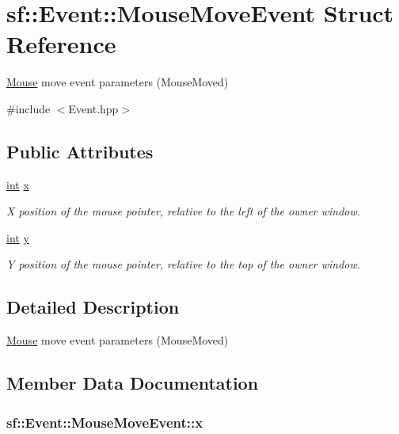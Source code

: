 \hypertarget{structsf_1_1_event_1_1_mouse_move_event}{\section{sf\-:\-:Event\-:\-:Mouse\-Move\-Event Struct Reference}
\label{structsf_1_1_event_1_1_mouse_move_event}
}


\hyperlink{classsf_1_1_mouse}{Mouse} move event parameters (Mouse\-Moved)  




{\ttfamily \#include $<$Event.\-hpp$>$}

\subsection*{Public Attributes}
\begin{DoxyCompactItemize}
\item 
\hyperlink{term__entry_8h_ad65b480f8c8270356b45a9890f6499ae}{int} \hyperlink{structsf_1_1_event_1_1_mouse_move_event_aa3a23809afb905cbb52c66d8512e21fd}{x}
\begin{DoxyCompactList}\small\item\em X position of the mouse pointer, relative to the left of the owner window. \end{DoxyCompactList}\item 
\hyperlink{term__entry_8h_ad65b480f8c8270356b45a9890f6499ae}{int} \hyperlink{structsf_1_1_event_1_1_mouse_move_event_a86d78a2fba5b3abda16ca059f2392ad4}{y}
\begin{DoxyCompactList}\small\item\em Y position of the mouse pointer, relative to the top of the owner window. \end{DoxyCompactList}\end{DoxyCompactItemize}


\subsection{Detailed Description}
\hyperlink{classsf_1_1_mouse}{Mouse} move event parameters (Mouse\-Moved) 

\subsection{Member Data Documentation}
\hypertarget{structsf_1_1_event_1_1_mouse_move_event_aa3a23809afb905cbb52c66d8512e21fd}{
\subsubsection[{x}]{ sf\-::\-Event\-::\-Mouse\-Move\-Event\-::x}}\label{structsf_1_1_event_1_1_mouse_move_event_aa3a23809afb905cbb52c66d8512e21fd}


